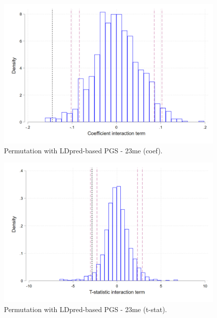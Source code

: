 \documentclass{article}
\begin{document}
\begin{figure}[H]
\centering 
\includegraphics[width=1\linewidth]{../figures/permutation_coef_23me.png}
\caption{Permutation with LDpred-based PGS - 23me (coef).}
\end{figure}

\begin{figure}[H]
\centering 
\includegraphics[width=1\linewidth]{../figures/permutation_tstat_23me.png}
\caption{Permutation with LDpred-based PGS - 23me (t-stat).}
\end{figure}
\end{document}
